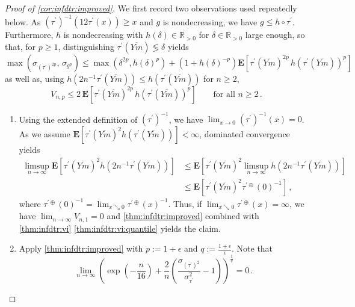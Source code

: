 \documentclass{article}
\newcommand{\R}{\mathbb{R}}
\newcommand{\Rpp}{\R_{>0}}
\newcommand{\lab}{\left[} %
\newcommand{\rab}{\right]} %
\newcommand{\ab}[1]{\lab #1 \rab} %
\newcommand{\abOf}[1]{\!\ab{#1}} %
\newcommand{\lb}{\left(} %
\newcommand{\rb}{\right)} %
\newcommand{\br}[1]{\lb #1 \rb} %
\newcommand{\brOf}[1]{\!\br{#1}} %
\newcommand{\E}{\mathbf{E}} %
\newcommand{\EOf}[1]{\E\abOf{#1}}
\newcommand{\pr}{^\prime}
\newcommand{\eqcm}{\,,} %
\newcommand{\eqfs}{\,.}
\newcommand{\ol}[2]{\overline{#1#2}}
\newcommand{\dtran}{\tau\pr}
\newcommand{\ddrtran}{\tau^{\prime\oplus}}
\newcommand{\invdtran}{(\tau\pr)^{-1}}
\begin{document}
\begin{proof}[Proof of \cref{cor:infdtr:improved}]
    We first record two observations used repeatedly below. As $\invdtran(12\dtran(x)) \geq x$ and $g$ is nondecreasing, we have $g \leq h \circ \dtran$. Furthermore, $h$ is nondecreasing with $h(\delta)\in\Rpp$ for $\delta\in\Rpp$ large enough, so that, for $p\geq1$, distinguishing $\dtran(\ol Ym) \lessgtr \delta$ yields
    \begin{equation}\label{eq:cor:infdtr:unif}
        \max\brOf{\sigma_{(\dtran)^{2p}},\, \sigma_{g^p}}
        \leq
        \max\brOf{\delta^{2p}, h(\delta)^p} + \br{1 + h(\delta)^{-p}} \EOf{\dtran(\ol{Y}m)^{2p}\, h(\dtran(\ol{Y}m))^{p}}
    \end{equation}
    as well as, using $h(2n^{-1}\dtran(\ol Ym)) \leq h(\dtran(\ol Ym))$ for $n\geq2$,
    \begin{equation}\label{eq:cor:infdtr:Vn}
        V_{n,p} \leq 2\, \EOf{\dtran(\ol{Y}m)^{2p}\, h(\dtran(\ol{Y}m))^{p}}
        \qquad\text{for all } n \geq 2
        \eqfs
    \end{equation}
    \begin{enumerate}[label=(\roman*)]
        \item
        Using the extended definition of $\invdtran$, we have $\lim_{x\to0}\invdtran(x) = 0$.
        As we assume $\EOf{\dtran(\ol{Y}m)^{2} h(\dtran(\ol{Y}m))} < \infty$, dominated convergence yields
        \begin{align}
            \limsup_{n\to\infty}\EOf{\dtran(\ol{Y}m)^{2} h(2n^{-1} \dtran(\ol{Y}m))}
            &\leq
            \EOf{\dtran(\ol{Y}m)^{2} \limsup_{n\to\infty} h(2n^{-1} \dtran(\ol{Y}m))}
            \\&\leq
            \EOf{\dtran(\ol{Y}m)^{2} \ddrtran(0)^{-1}}
            \eqcm
        \end{align}
        where $\ddrtran(0)^{-1} = \lim_{x\searrow0}\ddrtran(x)^{-1}$.
        Thus, if $\lim_{x\searrow0}\ddrtran(x) = \infty$, we have $\lim_{n\to\infty} V_{n,1}= 0$ and \cref{thm:infdtr:improved} combined with \cref{thm:infdtr:vi} \ref{thm:infdtr:vi:quantile} yields the claim.
        \item
        Apply \cref{thm:infdtr:improved} with $p := 1+\epsilon$ and $q := \frac{1+\epsilon}\epsilon$. Note that
        \begin{equation}
            \lim_{n\to\infty}\br{\exp\brOf{-\frac{n}{16}} +  \frac2n \br{\frac{\sigma_{(\dtran)^2}}{\sigma_{\dtran}^2}-1}}^{\frac1q} = 0
            \eqfs
        \end{equation}

\end{enumerate}
\end{proof}
\end{document}
